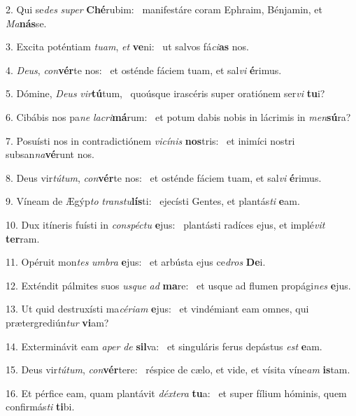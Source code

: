 2. Qui se\textit{des} \textit{su}\textit{per} \textbf{Ché}rubim: \ast\  manifestáre coram Ephraim, Bénjamin, et \textit{Ma}\textbf{nás}se.\

3. Excita poténtiam \textit{tu}\textit{am}, \textit{et} \textbf{ve}ni: \ast\  ut salvos fá\textit{ci}\textbf{as} nos.\

4. \textit{De}\textit{us}, \textit{con}\textbf{vér}te nos: \ast\  et osténde fáciem tuam, et sal\textit{vi} \textbf{é}rimus.\

5. Dómine, \textit{De}\textit{us} \textit{vir}\textbf{tú}tum, \ast\  quoúsque irascéris super oratiónem ser\textit{vi} \textbf{tu}i?\

6. Cibábis nos pa\textit{ne} \textit{la}\textit{cri}\textbf{má}rum: \ast\  et potum dabis nobis in lácrimis in \textit{men}\textbf{sú}ra?\

7. Posuísti nos in contradictiónem \textit{vi}\textit{cí}\textit{nis} \textbf{nos}tris: \ast\  et inimíci nostri subsan\textit{na}\textbf{vé}runt nos.\

8. Deus vir\textit{tú}\textit{tum}, \textit{con}\textbf{vér}te nos: \ast\  et osténde fáciem tuam, et sal\textit{vi} \textbf{é}rimus.\

9. Víneam de Ægýp\textit{to} \textit{trans}\textit{tu}\textbf{lís}ti: \ast\  ejecísti Gentes, et plantás\textit{ti} \textbf{e}am.\

10. Dux itíneris fuísti in \textit{con}\textit{spéc}\textit{tu} \textbf{e}jus: \ast\  plantásti radíces ejus, et implé\textit{vit} \textbf{ter}ram.\

11. Opéruit mon\textit{tes} \textit{um}\textit{bra} \textbf{e}jus: \ast\  et arbústa ejus ce\textit{dros} \textbf{De}i.\

12. Exténdit pálmites suos \textit{us}\textit{que} \textit{ad} \textbf{ma}re: \ast\  et usque ad flumen propági\textit{nes} \textbf{e}jus.\

13. Ut quid destruxísti ma\textit{cé}\textit{ri}\textit{am} \textbf{e}jus: \ast\  et vindémiant eam omnes, qui prætergrediún\textit{tur} \textbf{vi}am?\

14. Exterminávit eam \textit{a}\textit{per} \textit{de} \textbf{sil}va: \ast\  et singuláris ferus depástus \textit{est} \textbf{e}am.\

15. Deus vir\textit{tú}\textit{tum}, \textit{con}\textbf{vér}tere: \ast\  réspice de cælo, et vide, et vísita víne\textit{am} \textbf{is}tam.\

16. Et pérfice eam, quam plantávit \textit{déx}\textit{te}\textit{ra} \textbf{tu}a: \ast\  et super fílium hóminis, quem confirmás\textit{ti} \textbf{ti}bi.\

